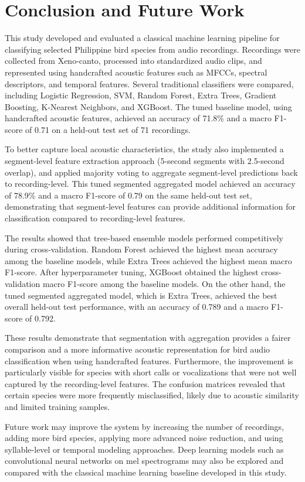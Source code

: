 \documentclass[runningheads]{llncs}
\begin{document}
\section{Conclusion and Future Work}

This study developed and evaluated a classical machine learning pipeline for classifying selected Philippine bird species from audio recordings. Recordings were collected from Xeno-canto, processed into standardized audio clips, and represented using handcrafted acoustic features such as MFCCs, spectral descriptors, and temporal features. Several traditional classifiers were compared, including Logistic Regression, SVM, Random Forest, Extra Trees, Gradient Boosting, K-Nearest Neighbors, and XGBoost. The tuned baseline model, using handcrafted acoustic features, achieved an accuracy of 71.8\% and a macro F1-score of 0.71 on a held-out test set of 71 recordings.

To better capture local acoustic characteristics, the study also implemented a segment-level feature extraction approach (5-second segments with 2.5-second overlap), and applied majority voting to aggregate segment-level predictions back to recording-level. This tuned segmented aggregated model achieved an accuracy of 78.9\% and a macro F1-score of 0.79 on the same held-out test set, demonstrating that segment-level features can provide additional information for classification compared to recording-level features.

The results showed that tree-based ensemble models performed competitively during cross-validation. Random Forest achieved the highest mean accuracy among the baseline models, while Extra Trees achieved the highest mean macro F1-score. After hyperparameter tuning, XGBoost obtained the highest cross-validation macro F1-score among the baseline models. On the other hand, the tuned segmented aggregated model, which is Extra Trees, achieved the best overall held-out test performance, with an accuracy of 0.789 and a macro F1-score of 0.792.

These results demonstrate that segmentation with aggregation provides a fairer comparison and a more informative acoustic representation for bird audio classification when using handcrafted features. Furthermore, the improvement is particularly visible for species with short calls or vocalizations that were not well captured by the recording-level features. The confusion matrices revealed that certain species were more frequently misclassified, likely due to acoustic similarity and limited training samples.

Future work may improve the system by increasing the number of recordings, adding more bird species, applying more advanced noise reduction, and using syllable-level or temporal modeling approaches. Deep learning models such as convolutional neural networks on mel spectrograms may also be explored and compared with the classical machine learning baseline developed in this study.



\end{document}
